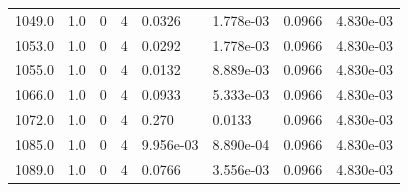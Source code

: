 \documentclass[preview]{standalone}
\begin{document}
{{{{{{\begin{tabular}{L{1.2cm}C{1.2cm} C{0.3cm}C{0.5cm} C{1.4cm}C{1.4cm} C{1.4cm}C{1.4cm}}
  1049.0  &   1.0  & 0     &  4 &  0.0326  & 1.778e-03  & 0.0966 &  4.830e-03   \\ 
  1053.0  &   1.0  & 0     &  4 &  0.0292  & 1.778e-03  & 0.0966 &  4.830e-03   \\ 
  1055.0  &   1.0  & 0     &  4 &  0.0132  & 8.889e-03  & 0.0966 &  4.830e-03   \\ 
  1066.0  &   1.0  & 0     &  4 &  0.0933  & 5.333e-03  & 0.0966 &  4.830e-03   \\ 
  1072.0  &   1.0  & 0     &  4 &  0.270  & 0.0133  & 0.0966 &  4.830e-03   \\ 
  1085.0  &   1.0  & 0     &  4 &  9.956e-03  & 8.890e-04  & 0.0966 &  4.830e-03   \\ 
  1089.0  &   1.0  & 0     &  4 &  0.0766  & 3.556e-03  & 0.0966 &  4.830e-03   \\ 
\hline 
\end{tabular} 

}}}}}}
\end{document}
